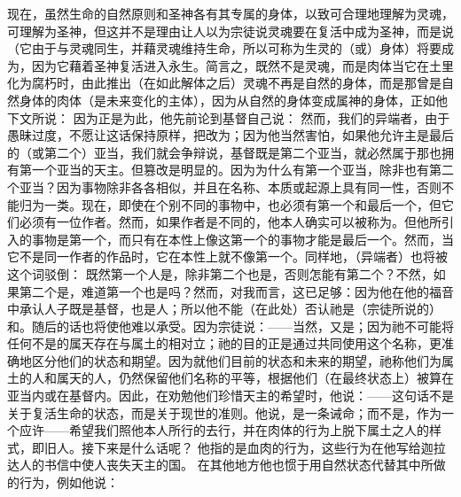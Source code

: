 现在，虽然生命的自然原则和圣神各有其专属的身体，以致可合理地理解为灵魂，可理解为圣神，但这并不是理由让人以为宗徒说灵魂要在复活中成为圣神，而是说（它由于与灵魂同生，并藉灵魂维持生命，所以可称为生灵的（或）身体）将要成为，因为它藉着圣神复活进入永生。简言之，既然不是灵魂，而是肉体当它在土里化为腐朽时，由此推出（在如此解体之后）灵魂不再是自然的身体，而是那曾是自然身体的肉体（是未来变化的主体），因为从自然的身体变成属神的身体，正如他下文所说：  因为正是为此，他先前论到基督自己说：  然而，我们的异端者，由于愚昧过度，不愿让这话保持原样，把改为；因为他当然害怕，如果他允许主是最后的（或第二个）亚当，我们就会争辩说，基督既是第二个亚当，就必然属于那也拥有第一个亚当的天主。但篡改是明显的。因为为什么有第一个亚当，除非也有第二个亚当？因为事物除非各各相似，并且在名称、本质或起源上具有同一性，否则不能归为一类。现在，即使在个别不同的事物中，也必须有第一个和最后一个，但它们必须有一位作者。然而，如果作者是不同的，他本人确实可以被称为。但他所引入的事物是第一个，而只有在本性上像这第一个的事物才能是最后一个。然而，当它不是同一作者的作品时，它在本性上就不像第一个。同样地，（异端者）也将被这个词驳倒：  既然第一个人是，除非第二个也是，否则怎能有第二个？不然，如果第二个是，难道第一个也是吗？然而，对我而言，这已足够：因为他在他的福音中承认人子既是基督，也是人；所以他不能（在此处）否认祂是（宗徒所说的）和。随后的话也将使他难以承受。因为宗徒说：——当然，又是；因为祂不可能将任何不是的属天存在与属土的相对立；祂的目的正是通过共同使用这个名称，更准确地区分他们的状态和期望。因为就他们目前的状态和未来的期望，祂称他们为属土的人和属天的人，仍然保留他们名称的平等，根据他们（在最终状态上）被算在亚当内或在基督内。因此，在劝勉他们珍惜天主的希望时，他说：——这句话不是关于复活生命的状态，而是关于现世的准则。他说，是一条诫命；而不是，作为一个应许——希望我们照他本人所行的去行，并在肉体的行为上脱下属土之人的样式，即旧人。接下来是什么话呢？  他指的是血肉的行为，这些行为在他写给迦拉达人的书信中使人丧失天主的国。  在其他地方他也惯于用自然状态代替其中所做的行为，例如他说：  